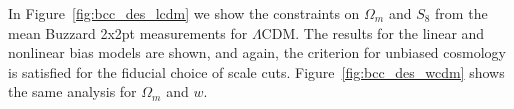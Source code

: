 \documentclass[fleqn,usenatbib]{mnras}
\newcommand{\lcdm}{$\Lambda$CDM}
\newcommand{\wcdm}{$w$CDM}
\newcommand\fig[1]{Figure~\ref{#1}}
\begin{document}
In \fig{fig:bcc_des_lcdm} we show the constraints on $\Omega_m$ and $S_8$ from the mean Buzzard 2x2pt measurements for \lcdm. The results for the linear and nonlinear bias models are shown, and again, the criterion for unbiased cosmology is satisfied for the fiducial choice of scale cuts. 
\fig{fig:bcc_des_wcdm} shows the same analysis for $\Omega_m$ and $w$.



\end{document}
